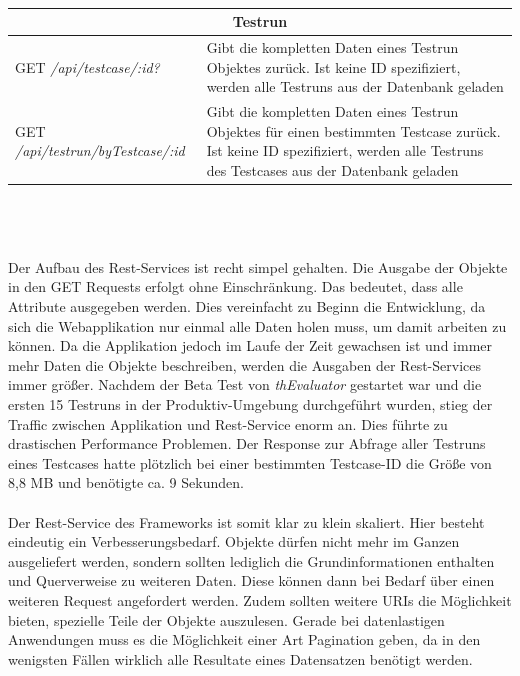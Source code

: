 \\
\\
\\
{\footnotesize
\begin{tabular}{ p{5.5cm} p{9cm} }
  \hline
  \multicolumn{2}{c}{\textbf{Testrun}} \\
  \hline
  GET \textit{/api/testcase/:id?} & Gibt die kompletten Daten eines Testrun Objektes zurück. Ist keine ID spezifiziert, werden alle Testruns aus der Datenbank geladen\vspace{0.2cm}\\
  GET \textit{/api/testrun/byTestcase/:id} & Gibt die kompletten Daten eines Testrun Objektes für einen bestimmten Testcase zurück. Ist keine ID spezifiziert, werden alle Testruns des Testcases aus der Datenbank geladen\vspace{0.2cm}\\

  \hline
\end{tabular}
}
\\
\\
\\
Der Aufbau des Rest-Services ist recht simpel gehalten. Die Ausgabe der Objekte in den GET Requests erfolgt ohne Einschränkung. Das bedeutet, dass alle Attribute ausgegeben werden. Dies vereinfacht zu Beginn die Entwicklung, da sich die Webapplikation nur einmal alle Daten holen muss, um damit arbeiten zu können. Da die Applikation jedoch im Laufe der Zeit gewachsen ist und immer mehr Daten die Objekte beschreiben, werden die Ausgaben der Rest-Services immer größer. Nachdem der Beta Test von \textit{thEvaluator} gestartet war und die ersten 15 Testruns in der Produktiv-Umgebung durchgeführt wurden, stieg der Traffic zwischen Applikation und Rest-Service enorm an. Dies führte zu drastischen Performance Problemen. Der Response zur Abfrage aller Testruns eines Testcases hatte plötzlich bei einer bestimmten Testcase-ID die Größe von 8,8 MB und benötigte ca. 9 Sekunden.\\
\\
Der Rest-Service des Frameworks ist somit klar zu klein skaliert. Hier besteht eindeutig ein Verbesserungsbedarf. Objekte dürfen nicht mehr im Ganzen ausgeliefert werden, sondern sollten lediglich die Grundinformationen enthalten und Querverweise zu weiteren Daten. Diese können dann bei Bedarf über einen weiteren Request angefordert werden. Zudem sollten weitere \Gls{URI}s die Möglichkeit bieten, spezielle Teile der Objekte auszulesen. Gerade bei datenlastigen Anwendungen muss es die Möglichkeit einer Art Pagination geben, da in den wenigsten Fällen wirklich alle Resultate eines Datensatzen benötigt werden.


